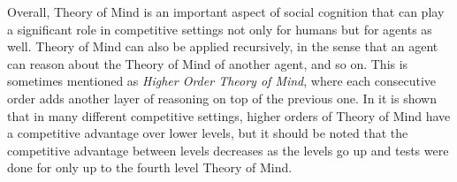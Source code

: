 Overall, Theory of Mind is an important aspect of social cognition that can play a significant role in competitive settings not only for humans but for agents as well. Theory of Mind can also be applied recursively, in the sense that an agent can reason about the Theory of Mind of another agent, and so on. This is sometimes mentioned as \textit{Higher Order Theory of Mind}, where each consecutive order adds another layer of reasoning on top of the previous one. In \cite{de2013much} it is shown that in many different competitive settings, higher orders of Theory of Mind have a competitive advantage over lower levels, but it should be noted that the competitive advantage between levels decreases as the levels go up and tests were done for only up to the fourth level Theory of Mind.

